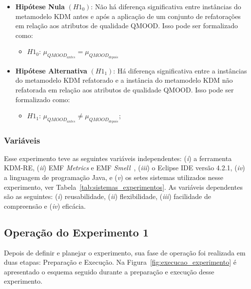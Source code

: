 \begin{itemize}
\item \textbf{Hipótese Nula} \textbf{$(H1_{0})$}: Não há diferença significativa entre instâncias do metamodelo KDM antes e após a aplicação de um conjunto de refatorações em relação aos atributos de qualidade QMOOD. Isso pode ser formalizado como: 

\begin{itemize}
\item $H1_{0}$: $\mu_{QMOOD_{antes}} = \mu_{QMOOD_{depois}}$
\end{itemize}

\item \textbf{Hipótese Alternativa} \textbf{$(H1_{1})$}: Há diferença significativa entre a instâncias do metamodelo KDM refatorado e a instância do metamodelo KDM não refatorada em relação aos atributos de qualidade QMOOD. Isso pode ser formalizado como: 

\begin{itemize}
\item $H1_{1}$: $\mu_{QMOOD_{antes}} \neq \mu_{QMOOD_{depois}}$;
\end{itemize}

\end{itemize}

\subsubsection{Variáveis}

Esse experimento teve as seguintes variáveis independentes: (\textit{i}) a ferramenta KDM-RE, (\textit{ii}) EMF \textit{Metrics} e EMF \textit{Smell}~\cite{Arendt_2012}, (\textit{iii}) o Eclipse IDE versão 4.2.1, (\textit{iv}) a linguagem de programação Java, e (\textit{v}) os setes sistemas utilizados nesse experimento, ver Tabela~\ref{tab:sistemas_experimentos}. As variáveis dependentes são as seguintes: (\textit{i}) reusabilidade, (\textit{ii}) flexibilidade, (\textit{iii}) facilidade de compreensão e (\textit{iv}) eficácia.

\subsection{Operação do Experimento 1}

Depois de definir e planejar o experimento, sua fase de operação foi realizada em duas etapas: Preparação e Execução. Na Figura~\ref{fig:execucao_experimento} é apresentado o esquema seguido durante a preparação e execução desse experimento.


